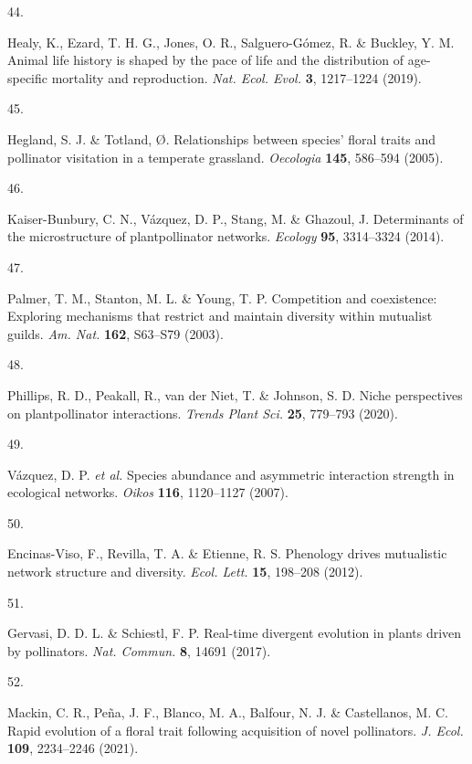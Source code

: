 \documentclass[
  12pt,
  a4paper,
]{article}
\newlength{\cslhangindent}
\newlength{\csllabelwidth}
\newlength{\cslentryspacingunit} %
\newenvironment{CSLReferences}[2] %
 {%
  \setlength{\parindent}{0pt}
  \ifodd #1
  \let\oldpar\par
  \def\par{\hangindent=\cslhangindent\oldpar}
  \fi
  \setlength{\parskip}{#2\cslentryspacingunit}
 }%
 {}
\newcommand{\CSLLeftMargin}[1]{\parbox[t]{\csllabelwidth}{#1}}
\newcommand{\CSLRightInline}[1]{\parbox[t]{\linewidth - \csllabelwidth}{#1}\break}
\begin{document}
\begin{CSLReferences}{0}{0}
\leavevmode{}%
\CSLLeftMargin{44. }
\CSLRightInline{Healy, K., Ezard, T. H. G., Jones, O. R., Salguero-Gómez, R. \& Buckley, Y. M. Animal life history is shaped by the pace of life and the distribution of age-specific mortality and reproduction. \emph{Nat. Ecol. Evol.} \textbf{3}, 1217--1224 (2019).}

\leavevmode{}%
\CSLLeftMargin{45. }
\CSLRightInline{Hegland, S. J. \& Totland, Ø. Relationships between species' floral traits and pollinator visitation in a temperate grassland. \emph{Oecologia} \textbf{145}, 586--594 (2005).}

\leavevmode{}%
\CSLLeftMargin{46. }
\CSLRightInline{Kaiser-Bunbury, C. N., Vázquez, D. P., Stang, M. \& Ghazoul, J. Determinants of the microstructure of plant\textendash pollinator networks. \emph{Ecology} \textbf{95}, 3314--3324 (2014).}

\leavevmode{}%
\CSLLeftMargin{47. }
\CSLRightInline{Palmer, T. M., Stanton, M. L. \& Young, T. P. Competition and coexistence: Exploring mechanisms that restrict and maintain diversity within mutualist guilds. \emph{Am. Nat.} \textbf{162}, S63--S79 (2003).}

\leavevmode{}%
\CSLLeftMargin{48. }
\CSLRightInline{Phillips, R. D., Peakall, R., van der Niet, T. \& Johnson, S. D. Niche perspectives on plant\textendash pollinator interactions. \emph{Trends Plant Sci.} \textbf{25}, 779--793 (2020).}

\leavevmode{}%
\CSLLeftMargin{49. }
\CSLRightInline{Vázquez, D. P. \emph{et al.} Species abundance and asymmetric interaction strength in ecological networks. \emph{Oikos} \textbf{116}, 1120--1127 (2007).}

\leavevmode{}%
\CSLLeftMargin{50. }
\CSLRightInline{Encinas-Viso, F., Revilla, T. A. \& Etienne, R. S. Phenology drives mutualistic network structure and diversity. \emph{Ecol. Lett.} \textbf{15}, 198--208 (2012).}

\leavevmode{}%
\CSLLeftMargin{51. }
\CSLRightInline{Gervasi, D. D. L. \& Schiestl, F. P. Real-time divergent evolution in plants driven by pollinators. \emph{Nat. Commun.} \textbf{8}, 14691 (2017).}

\leavevmode{}%
\CSLLeftMargin{52. }
\CSLRightInline{Mackin, C. R., Peña, J. F., Blanco, M. A., Balfour, N. J. \& Castellanos, M. C. Rapid evolution of a floral trait following acquisition of novel pollinators. \emph{J. Ecol.} \textbf{109}, 2234--2246 (2021).}


\end{CSLReferences}
\end{document}
